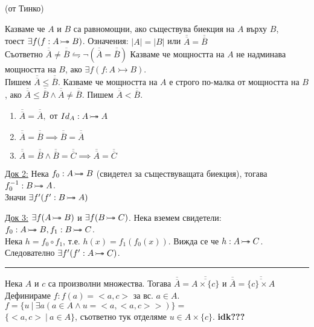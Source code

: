\documentclass[fleqn, titlepage, 12pt]{report}
\newcommand*\rightbijectionarrow{\mathrel{\ooalign{$\twoheadrightarrow$\cr\hidewidth\hbox{$\rightarrowtail\mkern 1mu$}\cr}}}
\begin{document}
\begin{center}
(от Тинко)
\end{center}

\begin{center}
\end{center}
\bigbreak

 Казваме че $A$ и $B$ са равномощни, ако съществува биекция на $A$ върху $B$,\\
тоест $\exists{f}(f: A \rightbijectionarrow B)$.
Означения: $|A| = |B| $ или $ \overline{\overline{A}} = \overline{\overline{B}}$\\
Съответно $\overline{\overline{A}} \neq \overline{\overline{B}} \leftrightharpoons \lnot(\overline{\overline{A}} = \overline{\overline{B}})$
\bigbreak
Казваме че мощността на $A$ не надминава мощността на $B$, ако $\exists{f}(f: A \rightarrowtail B)$.\\
Пишем $\overline{\overline{A}} \leq \overline{\overline{B}}$.
\bigbreak
Казваме че мощността на $A$ е строго по-малка от мощността на $B$, ако $\overline{\overline{A}} \leq \overline{\overline{B}} \land \overline{\overline{A}} \neq \overline{\overline{B}}$. Пишем $\overline{\overline{A}} < \overline{\overline{B}}$.
\bigbreak

\begin{enumerate}
  \item $\overline{\overline{A}} = \overline{\overline{A}}, $ от $Id_A: A \rightbijectionarrow A$
  \item $\overline{\overline{A}} = \overline{\overline{B}} \implies \overline{\overline{B}} = \overline{\overline{A}}$
  \item $\overline{\overline{A}} = \overline{\overline{B}} \land \overline{\overline{B}} = \overline{\overline{C}}
    \implies \overline{\overline{A}} = \overline{\overline{C}}$
\end{enumerate}

\underline{Док 2:} Нека $f_0: A \rightbijectionarrow B$ (свидетел за съществуващата биекция), тогава $f_0^{-1}: B \rightbijectionarrow A$.\\
Значи $\exists{f'}(f': B \rightbijectionarrow A)$
\bigbreak

\underline{Док 3:} $\exists{f}(A \rightbijectionarrow B)$ и $ \exists{f}(B \rightbijectionarrow C)$. Нека вземем
свидетели: $f_0: A \rightbijectionarrow B, f_1: B \rightbijectionarrow C$. \\
Нека $h = f_0 \circ f_1$, т.е. $h(x) = f_1(f_0(x))$. Вижда се че $h: A \rightbijectionarrow C$.
Следователно $\exists{f'}(f': A \rightbijectionarrow C)$.
\bigbreak
\hrule
\bigbreak
Нека $A$ и $c$ са произволни множества. Тогава $\overline{\overline{A}} = \overline{\overline{A \times \{ c \} }}$
и $\overline{\overline{A}} = \overline{\overline{\{ c \} \times  A}}$\\
Дефинираме $f: f(a) = <a,c>$ за вс. $a \in A$.
$f = \{u\ |\ \exists{a}(a \in A \land u = <a,<a,c>>)\} =$ \\
$\{<a,c>\ |\ a \in A\}$, съответно тук отделяме $u \in A \times \{ c \}$. \textbf{idk???}
\bigbreak
\end{document}
